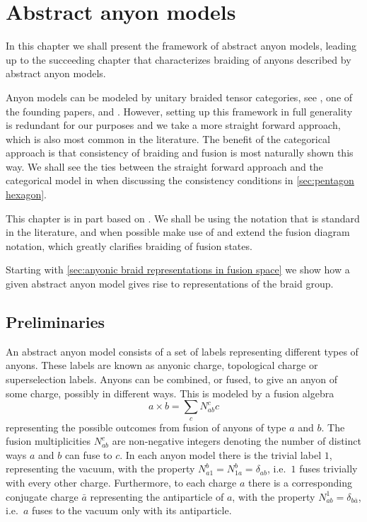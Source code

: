 
\chapter{Abstract anyon models}\label{anyon models}

In this chapter we shall present the framework of abstract anyon models, leading up to the succeeding chapter that characterizes braiding of anyons described by abstract anyon models.

Anyon models can be modeled by unitary braided tensor categories, see \cite{kitaev}, one of the founding papers, and \cite{naaijkens,prakash,tensor categories,tuba}. However, setting up this framework in full generality is redundant for our purposes and we take a more straight forward approach, which is also most common in the literature. The benefit of the categorical approach is that consistency of braiding and fusion is most naturally shown this way. We shall see the ties between the straight forward approach and the categorical model in when discussing the consistency conditions in \cref{sec:pentagon hexagon}.

This chapter is in part based on \cite{preskill,kitaev,bonderson}. We shall be using the notation that is standard in the literature, and when possible make use of and extend the fusion diagram notation, which greatly clarifies braiding of fusion states.

Starting with \cref{sec:anyonic braid representations in fusion space} we show how a given abstract anyon model gives rise to representations of the braid group.

\section{Preliminaries}

An abstract anyon model consists of a set of labels representing different types of anyons. These labels are known as anyonic charge, topological charge or superselection labels. Anyons can be combined, or fused, to give an anyon of some charge, possibly in different ways. This is modeled by a fusion algebra
\begin{equation}
  a \times b = \sum_c N_{ab}^c c
\end{equation}
representing the possible outcomes from fusion of anyons of type $a$ and $b$. The fusion multiplicities $N_{ab}^c$ are non-negative integers denoting the number of distinct ways $a$ and $b$ can fuse to $c$. In each anyon model there is the trivial label $1$, representing the vacuum, with the property $N_{a1}^b = N_{1a}^b = \delta_{ab}$, i.e.\ $1$ fuses trivially with every other charge. Furthermore, to each charge $a$ there is a corresponding conjugate charge $\bar{a}$ representing the antiparticle of $a$, with the property $N_{ab}^1 = \delta_{b\bar{a}}$, i.e.\ $a$ fuses to the vacuum only with its antiparticle.

